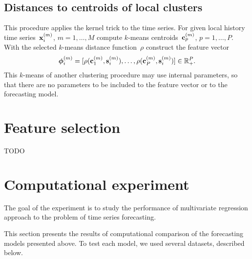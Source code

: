 \documentclass[conference]{IEEEtran}
\begin{document}
\subsection{Distances to centroids of local clusters}
This procedure applies the kernel trick to the time series. For given local history time series~${\mathbf{x}}_i^{(m)}$, $m=1,\dots, M$ compute $k$-means centroids~${\mathbf{c}}_p^{(m)}$, $p = 1, \dots, P$.  With the selected $k$-means distance function~$\rho$ construct the feature vector
\[
{\boldsymbol{\phi}}_i^{(m)} = [\rho({\mathbf{c}}_1^{(m)},{\mathbf{s}}_i^{(m)}),\dots,\rho({\mathbf{c}}^{(m)}_P,{\mathbf{s}}_i^{(m)})] \in \mathbb{R}_+^P.
\]
This $k$-means of another clustering procedure may use internal parameters, so that there are no parameters to be included to the feature vector or to the forecasting model.



\section{Feature selection}
TODO



\section{Computational experiment}
The goal of the experiment is to study the performance of multivariate regression approach to the problem of
time series forecasting.

This section presents the results of computational comparison of the forecasting models presented above. To test each model, we used several datasets, described below.
\end{document}
